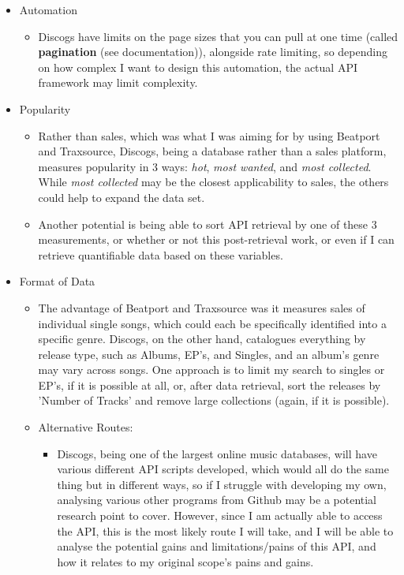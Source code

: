 \documentclass{article}
\begin{document}
\begin{itemize}
    \item Automation
    \begin{itemize}
        \item Discogs have limits on the page sizes that you can pull at one time (called \textbf{pagination} (see documentation)), alongside rate limiting, so depending on how complex I want to design this automation, the actual API framework may limit complexity.
    \end{itemize}
    \item Popularity
    \begin{itemize}
        \item Rather than sales, which was what I was aiming for by using Beatport and Traxsource, Discogs, being a database rather than a sales platform, measures popularity in 3 ways: \textit{hot}, \textit{most wanted}, and \textit{most collected}. While \textit{most collected} may be the closest applicability to sales, the others could help to expand the data set.
        \item Another potential is being able to sort API retrieval by one of these 3 measurements, or whether or not this post-retrieval work, or even if I can retrieve quantifiable data based on these variables.
    \end{itemize}
    \item Format of Data
    \begin{itemize}
        \item The advantage of Beatport and Traxsource was it measures sales of individual single songs, which could each be specifically identified into a specific genre. Discogs, on the other hand, catalogues everything by release type, such as Albums, EP's, and Singles, and an album's genre may vary across songs. One approach is to limit my search to singles or EP's, if it is possible at all, or, after data retrieval, sort the releases by 'Number of Tracks' and remove large collections (again, if it is possible).
    \item Alternative Routes:
        \begin{itemize}
            \item Discogs, being one of the largest online music databases, will have various different API scripts developed, which would all do the same thing but in different ways, so if I struggle with developing my own, analysing various other programs from Github may be a potential research point to cover. However, since I am actually able to access the API, this is the most likely route I will take, and I will be able to analyse the potential gains and limitations/pains of this API, and how it relates to my original scope's pains and gains.
        \end{itemize}
    \end{itemize}
\end{itemize}
\end{document}
